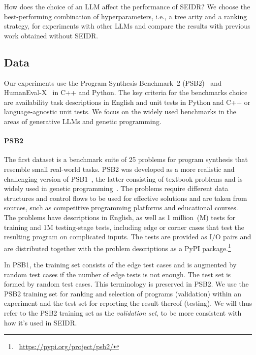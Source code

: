 How does the choice of an LLM affect the performance of SEIDR? 
We choose the best-performing combination of hyperparameters, i.e., a tree arity and a ranking strategy, for experiments with other LLMs and compare the results with previous work obtained without SEIDR. 

\newpage \subsection{Data}
\label{sec:seidr-data}

Our experiments use the Program Synthesis Benchmark~2 (PSB2)~\cite{helmuth2022:applying} and HumanEval-X~\cite{zheng2023:codegeex} in C++ and Python. 
The key criteria for the benchmarks choice are availability task descriptions in English and unit tests in Python and C++ or language-agnostic unit tests. 
We focus on the widely used benchmarks in the areas of generative LLMs and genetic programming. 

\paragraph{PSB2}
The first dataset is a benchmark suite of 25 problems for program synthesis that resemble small real-world tasks. PSB2 was developed as a more realistic and challenging version of PSB1~\cite{helmuth2015:general}, the latter consisting of textbook problems and is widely used in genetic programming~\cite{sobania2022:choose}. 
The problems require different data structures and control flows to be used for effective solutions and are taken from sources, such as competitive programming platforms and educational courses. 
The problems have descriptions in English, as well as 1 million~(M) tests for training and 1M testing-stage tests, including edge or corner cases that test the resulting program on complicated inputs. 
The tests are provided as I/O pairs and are distributed together with the problem descriptions as a PyPI package.\footnote{~\url{https://pypi.org/project/psb2/}} 

In PSB1, the training set consists of the edge test cases and is augmented by random test cases if the number of edge tests is not enough. The test set is formed by random test cases. 
This terminology is preserved in PSB2. 
We use the PSB2 training set for ranking and selection of programs (validation) within an experiment and the test set for reporting the result thereof (testing).
We will thus refer to the PSB2 training set as the \emph{validation set}, to be more consistent with how it's used in SEIDR.

